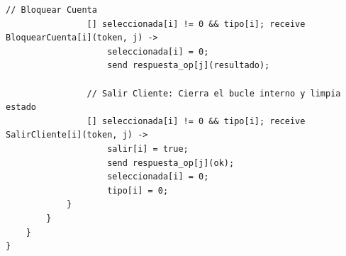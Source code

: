 \begin{lstlisting}[caption=Servidor Bancario con Estado]
                // Bloquear Cuenta
                [] seleccionada[i] != 0 && tipo[i]; receive BloquearCuenta[i](token, j) ->
                    seleccionada[i] = 0;
                    send respuesta_op[j](resultado);

                // Salir Cliente: Cierra el bucle interno y limpia estado
                [] seleccionada[i] != 0 && tipo[i]; receive SalirCliente[i](token, j) ->
                    salir[i] = true;
                    send respuesta_op[j](ok);
                    seleccionada[i] = 0;
                    tipo[i] = 0;
            }
        }
    }
}
\end{lstlisting}